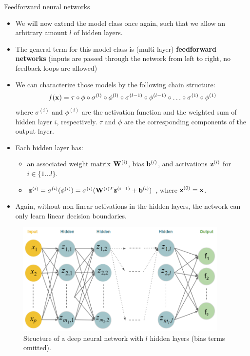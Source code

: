 \documentclass[11pt,compress,t,notes=noshow, xcolor=table]{beamer}
\begin{document}
\begin{vbframe}{Feedforward neural networks}
\begin{itemize}
\vspace{15mm}
\item We will now extend the model class once again, such that we allow an arbitrary amount $l$ of hidden layers.
\vspace{5mm}
\item The general term for this model class is (multi-layer) \textbf{feedforward networks} (inputs are passed through the network from left to right, no feedback-loops are allowed)
\end{itemize}
\framebreak

\begin{itemize}
\item We can characterize those models by the following chain structure: $$f(\mathbf{x}) = \tau \circ \phi \circ \sigma^{(l)} \circ \phi^{(l)} \circ \sigma^{(l-1)} \circ \phi^{(l-1)} \circ \ldots \circ \sigma^{(1)} \circ \phi^{(1)}$$ where $\sigma^{(i)}$ and $\phi^{(i)}$ are the activation function and the weighted sum of hidden layer $i$, respectively. $\tau$ and $\phi$ are the corresponding components of the output layer.
\vspace{5mm}
\item Each hidden layer has: 
\begin{itemize}
\vspace{2mm}
\item an associated weight matrix $\mathbf{W}^{(i)}$, bias $\mathbf{b}^{(i)}$, and activations $\mathbf{z}^{(i)}$ for $i \in \{ 1 \ldots l\}$.
\vspace{2mm}
\item $\mathbf{z}^{(i)} = \sigma^{(i)}(\phi^{(i)}) = \sigma^{(i)}(\mathbf{W}^{(i)T}\mathbf{z}^{(i - 1)} + \mathbf{b}^{(i)})$ , where $\mathbf{z}^{(0)} = \mathbf{x}$.
\end{itemize}
\vspace{5mm}
\item Again, without non-linear activations in the hidden layers, the network can only learn linear decision boundaries.
  \end{itemize}
\framebreak

\lz
\begin{figure}
\centering
\includegraphics[width=10.5cm]{figure/deepneuralnet_new.png}
\caption{Structure of a deep neural network with $l$ hidden layers (bias terms omitted).}
  \end{figure}
\end{vbframe}  
\end{document}
